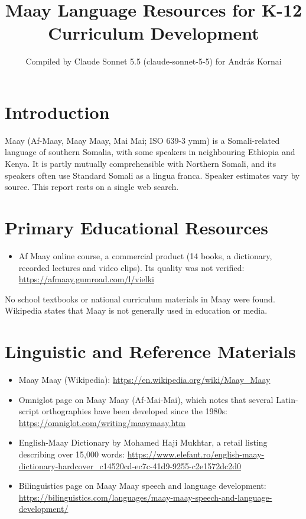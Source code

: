 \documentclass[12pt]{article}
\title{Maay Language Resources for K-12 Curriculum Development}
\author{Compiled by Claude Sonnet 5.5 (claude-sonnet-5-5) for Andr\'as Kornai}
\date{}
\begin{document}
\maketitle

\section{Introduction}
Maay (Af-Maay, Maay Maay, Mai Mai; ISO 639-3 ymm) is a Somali-related language of southern Somalia, with some speakers in neighbouring Ethiopia and Kenya. It is partly mutually comprehensible with Northern Somali, and its speakers often use Standard Somali as a lingua franca. Speaker estimates vary by source. This report rests on a single web search.

\section{Primary Educational Resources}
\begin{itemize}
\item Af Maay online course, a commercial product (14 books, a dictionary, recorded lectures and video clips). Its quality was not verified: \url{https://afmaay.gumroad.com/l/vielki}
\end{itemize}
No school textbooks or national curriculum materials in Maay were found. Wikipedia states that Maay is not generally used in education or media.

\section{Linguistic and Reference Materials}
\begin{itemize}
\item Maay Maay (Wikipedia): \url{https://en.wikipedia.org/wiki/Maay_Maay}
\item Omniglot page on Maay Maay (Af-Mai-Mai), which notes that several Latin-script orthographies have been developed since the 1980s: \url{https://omniglot.com/writing/maaymaay.htm}
\item English-Maay Dictionary by Mohamed Haji Mukhtar, a retail listing describing over 15,000 words: \url{https://www.elefant.ro/english-maay-dictionary-hardcover_c14520cd-ec7c-41d9-9255-c2e1572dc2d0}
\item Bilinguistics page on Maay Maay speech and language development: \url{https://bilinguistics.com/languages/maay-maay-speech-and-language-development/}
\end{itemize}
\end{document}
